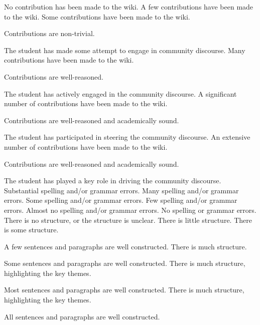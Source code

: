 \documentclass{../fal_assignment}
\begin{document}
\begin{markingrubric}
%
        \grade\fail 	No contribution has been made to the wiki.
        \grade 		A few contributions have been made to the wiki.
        \grade 		Some contributions have been made to the wiki.
        \par		Contributions are non-trivial.
        \par		The student has made some attempt to engage in community discourse.
        \grade 		Many contributions have been made to the wiki.
        \par		Contributions are well-reasoned.
        \par		The student has actively engaged in the community discourse.
        \grade 		A significant number of contributions have been made to the wiki.
        \par		Contributions are well-reasoned and academically sound.
        \par		The student has participated in steering the community discourse.
        \grade 		An extensive number of contributions have been made to the wiki.
        \par		Contributions are well-reasoned and academically sound.
        \par		The student has played a key role in driving the community discourse.
%
        \grade\fail 	Substantial spelling and/or grammar errors.
        \grade 		Many spelling and/or grammar errors.
        \grade 		Some spelling and/or grammar errors.  
        \grade 		Few spelling and/or grammar errors.
        \grade 		Almost no spelling and/or grammar errors.
        \grade 		No spelling or grammar errors.
%
        \grade\fail 	There is no structure, or the structure is unclear.
        \grade 		There is little structure.
        \grade 		There is some structure.
        \par 		A few sentences and paragraphs are well constructed.
        \grade 		There is much structure.
        \par 		Some sentences and paragraphs are well constructed.
        \grade 		There is much structure, highlighting the key themes.
        \par 		Most sentences and paragraphs are well constructed.
        \grade 		There is much structure, highlighting the key themes.
        \par 		All sentences and paragraphs are well constructed.
\end{markingrubric}
\end{document}
